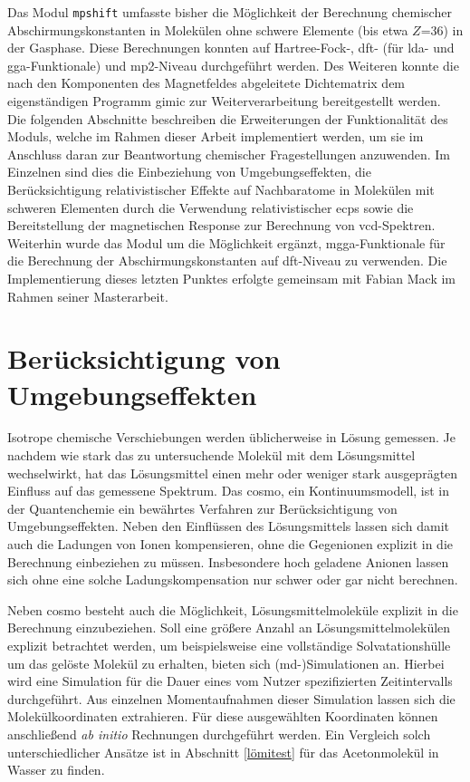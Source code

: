 Das Modul \texttt{mpshift} umfasste bisher die Möglichkeit der Berechnung chemischer Abschirmungskonstanten in Molekülen ohne schwere Elemente (bis etwa $Z$=36) in der Gasphase. Diese Berechnungen konnten auf Hartree-Fock-, \ac{dft}- (für \ac{lda}- und \ac{gga}-Funktionale) und \ac{mp2}-Niveau durchgeführt werden. Des Weiteren konnte die nach den Komponenten des Magnetfeldes abgeleitete Dichtematrix dem eigenständigen Programm \ac{gimic} zur Weiterverarbeitung bereitgestellt werden. Die folgenden Abschnitte beschreiben die Erweiterungen der Funktionalität des Moduls, welche im Rahmen dieser Arbeit implementiert werden, um sie im Anschluss daran zur Beantwortung chemischer Fragestellungen anzuwenden. Im Einzelnen sind dies die Einbeziehung von Umgebungseffekten, die Berücksichtigung relativistischer Effekte auf Nachbaratome in Molekülen mit schweren Elementen durch die Verwendung relativistischer \acp{ecp} sowie die Bereitstellung der magnetischen Response zur Berechnung von \ac{vcd}-Spektren. Weiterhin wurde das Modul um die Möglichkeit ergänzt, \ac{mgga}-Funktionale für die Berechnung der Abschirmungskonstanten auf \ac{dft}-Niveau zu verwenden. Die Implementierung dieses letzten Punktes erfolgte gemeinsam mit Fabian Mack im Rahmen seiner Masterarbeit.\supercite{mack2017} 


\section{Berücksichtigung von Umgebungseffekten}\label{umgebung}
Isotrope chemische Verschiebungen werden üblicherweise in Lösung gemessen. Je nachdem wie stark das zu untersuchende Molekül mit dem Lösungsmittel wechselwirkt, hat das Lösungsmittel einen mehr oder weniger stark ausgeprägten Einfluss auf das gemessene Spektrum. Das \acf{cosmo},\supercite{klamt1993cosmo} ein Kontinuumsmodell, ist in der Quantenchemie ein bewährtes Verfahren zur Berücksichtigung von Umgebungseffekten. Neben den Einflüssen des Lösungsmittels lassen sich damit auch die Ladungen von Ionen  kompensieren, ohne die Gegenionen explizit in die Berechnung einbeziehen zu müssen. Insbesondere hoch geladene Anionen lassen sich ohne eine solche Ladungskompensation nur schwer oder gar nicht berechnen. 

Neben \ac{cosmo} besteht auch die Möglichkeit, Lösungsmittelmoleküle explizit in die Berechnung einzubeziehen. Soll eine größere Anzahl an Lösungsmittelmolekülen explizit betrachtet werden, um beispielsweise eine vollständige Solvatationshülle um das gelöste Molekül zu erhalten, bieten sich \mbox{(\acs{md}-)}Simulationen an. Hierbei wird eine Simulation für die Dauer eines vom Nutzer spezifizierten Zeitintervalls durchgeführt. Aus einzelnen Momentaufnahmen dieser Simulation lassen sich die Molekülkoordinaten extrahieren. Für diese ausgewählten Koordinaten können anschließend \textit{ab initio} Rechnungen durchgeführt werden. Ein Vergleich solch unterschiedlicher Ansätze ist in Abschnitt \ref{lömitest} für das Acetonmolekül in Wasser zu finden. 

